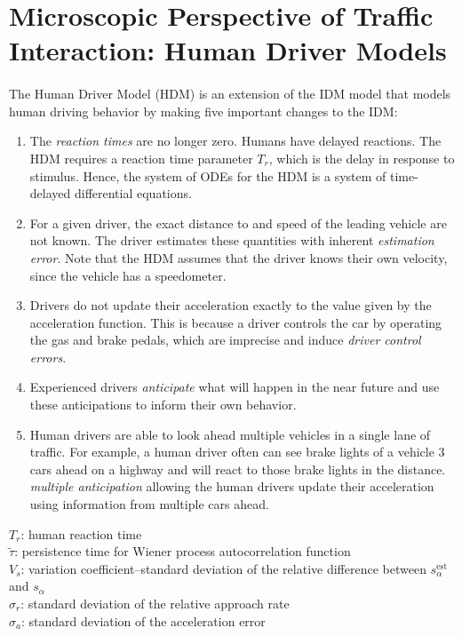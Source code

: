 \documentclass[12pt]{article}
\begin{document}
\section{Microscopic Perspective of Traffic Interaction: Human Driver Models}
\paragraph{}
The Human Driver Model (HDM) is an extension of the IDM model that models human driving behavior by making five important changes to the IDM:
\begin{enumerate}
  \item The\textit{ reaction times} are no longer zero.  Humans have delayed reactions.  The HDM requires a reaction time parameter $T_r$, which is the delay in response to stimulus.  Hence, the system of ODEs for the HDM is a system of time-delayed differential equations.
  \item For a given driver, the exact distance to and speed of the leading vehicle are not known.  The driver estimates these quantities with inherent \textit{estimation error}.  Note that the HDM assumes that the driver knows their own velocity, since the vehicle has a speedometer.
  \item Drivers do not update their acceleration exactly to the value given by the acceleration function.  This is because a driver controls the car by operating the gas and brake pedals, which are imprecise and induce \textit{driver control errors}.
  \item Experienced drivers \textit{anticipate} what will happen in the near future and use these anticipations to inform their own behavior.
  \item Human drivers are able to look ahead multiple vehicles in a single lane of traffic.  For example, a human driver often can see brake lights of a vehicle 3 cars ahead on a highway and will react to those brake lights in the distance. \textit{multiple anticipation} allowing the human drivers update their acceleration using information from multiple cars ahead.
\end{enumerate}
\begin{mymathbox}[title=HDM Parameters,colframe=blue!30!black]
  $T_r$: human reaction time\\
  $\tilde{\tau}$: persistence time for Wiener process autocorrelation function\\
  $V_s$: variation coefficient\---standard deviation of the relative difference between $s_\alpha^\text{est}$ and $s_\alpha$\\
  $\sigma_r$: standard deviation of the relative approach rate\\
  $\sigma_a$: standard deviation of the acceleration error
\end{mymathbox}
\end{document}
